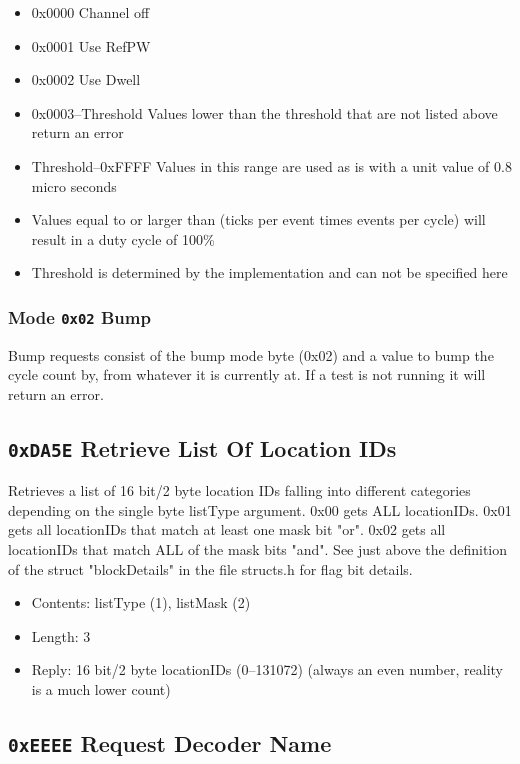 \documentclass[12pt,a4paper,titlepage]{article}
\begin{document}
\begin{itemize}
\item 0x0000 Channel off
\item 0x0001 Use RefPW
\item 0x0002 Use Dwell
\item 0x0003--Threshold Values lower than the threshold that are not listed above return an error
\item Threshold--0xFFFF Values in this range are used as is with a unit value of 0.8 micro seconds
\item Values equal to or larger than (ticks per event times events per cycle) will result in a duty cycle of 100\%
\item Threshold is determined by the implementation and can not be specified here
\end{itemize}

\subsubsection{Mode \texttt{0x02} Bump}

Bump requests consist of the bump mode byte (0x02) and a value to bump the cycle count by, from whatever it is currently at. If a test is not running it will return an error.


\subsection{\texttt{0xDA5E} Retrieve List Of Location IDs}

Retrieves a list of 16 bit/2 byte location IDs falling into different categories depending on the single byte listType argument. 0x00 gets ALL locationIDs. 0x01 gets all locationIDs that match at least one mask bit "or". 0x02 gets all locationIDs that match ALL of the mask bits "and". See just above the definition of the struct "blockDetails" in the file structs.h for flag bit details.

\begin{itemize}
\item Contents: listType (1), listMask (2)
\item Length: 3
\item Reply: 16 bit/2 byte locationIDs (0--131072) (always an even number, reality is a much lower count)
\end{itemize}


\subsection{\texttt{0xEEEE} Request Decoder Name}
\end{document}
